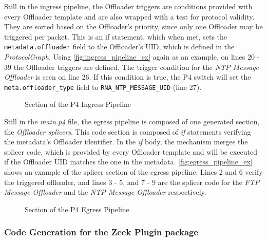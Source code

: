 Still in the ingress pipeline, the Offloader triggers are conditions provided with every Offloader template and are also wrapped with a test for protocol validity. They are sorted based on the Offloader's priority, since only one Offloader may be triggered per packet. This is an if statement, which when met, sets the \texttt{metadata.offloader} field to the Offloader's UID, which is defined in the \textit{ProtocolGraph}. Using \autoref{fig:ingress_pipeline_ex} again as an example, on lines 20 - 39 the Offloader triggers are defined. The trigger condition for the \textit{NTP Message Offloader} is seen on line 26. If this condition is true, the P4 switch will set the \texttt{meta.offloader\_type} field to \texttt{RNA\_NTP\_MESSAGE\_UID} (line 27).


\begin{figure}[htb]
    \caption{Section of the P4 Ingress Pipeline}
    \begin{center}
        
    \end{center}
    \label{fig:ingress_pipeline_ex}
\end{figure}

Still in the \textit{main.p4} file, the egress pipeline is composed of one generated section, the \textit{Offloader splicers}. This code section is composed of \textit{if} statements verifying the metadata's Offloader identifier. In the \textit{if} body, the mechanism merges the splicer code, which is provided by every Offloader template and will be executed if the Offloader UID matches the one in the metadata. \autoref{fig:egress_pipeline_ex} shows an example of the splicer section of the egress pipeline. Lines 2 and 6 verify the triggered offloader, and lines 3 - 5, and 7 - 9 are the splicer code for the \textit{FTP Message Offloader} and the \textit{NTP Message Offloader} respectively.

\begin{figure}[htb]
    \caption{Section of the P4 Egress Pipeline}
    \begin{center}
        
    \end{center}
    \label{fig:egress_pipeline_ex}
\end{figure}

\subsubsection*{Code Generation for the Zeek Plugin package}

